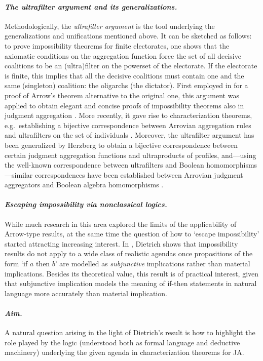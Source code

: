 \documentclass{llncs}
\numberwithin{equation}{section}
\begin{document}
\paragraph{\bf\em The ultrafilter argument and its generalizations.} Methodologically, the {\em ultrafilter argument} is the tool underlying the generalizations and unifications mentioned above. It can be sketched as follows: to prove impossibility theorems for finite electorates, one shows that the axiomatic conditions on the aggregation function force the set of all decisive coalitions to be an (ultra)filter on the powerset of the electorate. If the electorate is finite, this implies that all the decisive coalitions must contain one and the same (singleton) coalition: the oligarchs (the dictator). First employed in \cite{KiSo72} for a proof of Arrow's theorem alternative to the original one, this argument was applied to obtain elegant and concise proofs of impossibility theorems also in judgment aggregation  \cite{DM10}. More recently, it gave rise to characterization theorems, e.g.\ establishing a bijective correspondence between Arrovian aggregation rules and ultrafilters on the set of individuals \cite{HE12}. Moreover,  the ultrafilter argument has been generalized by Herzberg \cite{He08} to obtain a bijective correspondence between certain judgment aggregation functions and ultraproducts of profiles, and---using the well-known correspondence between ultrafilters and Boolean homomorphisms---similar correspondences have been established between Arrovian judgment aggregators and Boolean algebra homomorphisms \cite{He10}.

\paragraph{\bf\em  Escaping impossibility via nonclassical logics.} While much research in this area explored the limits of the applicability of  Arrow-type results, at the same time the question of how to `escape impossibility' started attracting increasing interest. In \cite{Di10}, Dietrich shows that impossibility results do not apply to a wide class of realistic agendas
once propositions of the form `if $a$ then $b$' are  modelled as {\em subjunctive} implications rather than material implications. Besides its theoretical value, this result is of practical interest, given that subjunctive implication models the meaning of if-then statements in natural language more accurately than  material implication.

\paragraph{\bf\em Aim.} A natural question arising in the light of Dietrich's result is how to highlight the role played by the logic (understood both as formal language and deductive machinery) underlying the given agenda in characterization theorems for JA.
\end{document}
